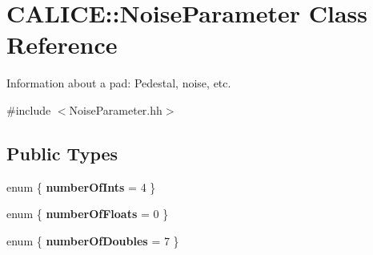 \section{CALICE::NoiseParameter Class Reference}
\label{classCALICE_1_1NoiseParameter}


Information about a pad: Pedestal, noise, etc.  


{\ttfamily \#include $<$NoiseParameter.hh$>$}\subsection*{Public Types}
\begin{DoxyCompactItemize}
\item 
enum \{ {\bfseries numberOfInts} = 4
 \}
\item 
enum \{ {\bfseries numberOfFloats} = 0
 \}
\item 
enum \{ {\bfseries numberOfDoubles} = 7
 \}
\end{DoxyCompactItemize}
